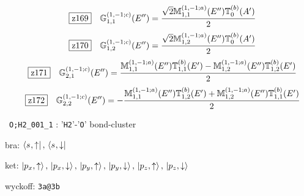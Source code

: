 \documentclass[fleqn,10pt,landscape]{jsarticle}
\begin{document}
\begin{dmath*}
\hspace*{3mm}\fbox{z169}\quad \mathbb{G}_{1,1}^{(1,-1;c)}(E^{\prime\prime})=\frac{\sqrt{2} \mathbb{M}_{1,1}^{(1,-1;a)}(E^{\prime\prime}) \mathbb{T}_{0}^{(b)}(A^{\prime})}{2}
\end{dmath*}
\begin{dmath*}
\hspace*{3mm}\fbox{z170}\quad \mathbb{G}_{1,2}^{(1,-1;c)}(E^{\prime\prime})=\frac{\sqrt{2} \mathbb{M}_{1,2}^{(1,-1;a)}(E^{\prime\prime}) \mathbb{T}_{0}^{(b)}(A^{\prime})}{2}
\end{dmath*}
\begin{dmath*}
\hspace*{3mm}\fbox{z171}\quad \mathbb{G}_{2,1}^{(1,-1;c)}(E^{\prime\prime})=\frac{\mathbb{M}_{1,1}^{(1,-1;a)}(E^{\prime\prime}) \mathbb{T}_{1,1}^{(b)}(E^{\prime}) - \mathbb{M}_{1,2}^{(1,-1;a)}(E^{\prime\prime}) \mathbb{T}_{1,2}^{(b)}(E^{\prime})}{2}
\end{dmath*}
\begin{dmath*}
\hspace*{3mm}\fbox{z172}\quad \mathbb{G}_{2,2}^{(1,-1;c)}(E^{\prime\prime})=- \frac{\mathbb{M}_{1,1}^{(1,-1;a)}(E^{\prime\prime}) \mathbb{T}_{1,2}^{(b)}(E^{\prime}) + \mathbb{M}_{1,2}^{(1,-1;a)}(E^{\prime\prime}) \mathbb{T}_{1,1}^{(b)}(E^{\prime})}{2}
\end{dmath*}
\vspace{5mm}

\noindent\textbullet\, \texttt{O;H2_001_1} : '\texttt{H2}'-'\texttt{O}' bond-cluster

\noindent\quad * bra: $\bra{s_{},\uparrow},\, \bra{s_{},\downarrow}$

\noindent\quad * ket: $\ket{p_{x},\uparrow},\, \ket{p_{x},\downarrow},\, \ket{p_{y},\uparrow},\, \ket{p_{y},\downarrow},\, \ket{p_{z},\uparrow},\, \ket{p_{z},\downarrow}$

\noindent\quad * wyckoff: \texttt{3a@3b}
\end{document}
